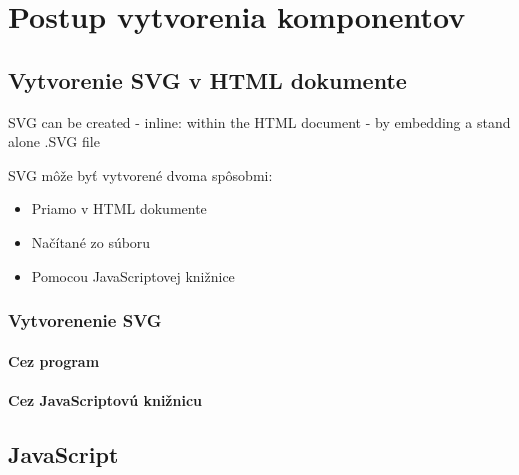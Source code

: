 \chapter{Postup vytvorenia komponentov}

\section{Vytvorenie SVG v HTML dokumente}

SVG can be created 
-   inline: within the HTML document 
-   by embedding a stand alone .SVG file

SVG môže byť vytvorené dvoma spôsobmi:
\begin{itemize}
	\item Priamo v HTML dokumente
	\item Načítané zo súboru
	\item Pomocou JavaScriptovej knižnice
\end{itemize}


 \subsection{Vytvorenenie SVG }
 
 \subsubsection{Cez program}
 
 \subsubsection{Cez JavaScriptovú knižnicu}



\section{JavaScript}